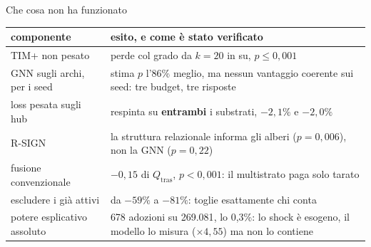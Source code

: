 \documentclass[aspectratio=169,10pt]{beamer}
\newcommand{\Qtras}{Q_{\mathrm{tras}}}
\begin{document}
\begin{frame}{Che cosa non ha funzionato}
  \centering
  \setlength{\tabcolsep}{8pt}
  \renewcommand{\arraystretch}{1.7}
  \begin{tabular}{|>{\raggedright\arraybackslash}m{}|>{\raggedright\arraybackslash}m{}|}
    \hline
    \rowcolor{tenue}\textbf{componente} & \textbf{esito, e come \`e stato verificato} \\
    \hline
    TIM+ non pesato & \textcolor{bordeaux}{perde col grado} da $k=20$ in su, $p \le 0{,}001$ \\
    \hline
    GNN sugli archi, per i seed & stima $p$ l'86\% meglio, ma nessun vantaggio coerente sui seed: tre budget, tre risposte \\
    \hline
    loss pesata sugli hub & respinta su \textbf{entrambi} i substrati, $-2{,}1\%$ e $-2{,}0\%$ \\
    \hline
    R-SIGN & la struttura relazionale informa gli alberi ($p=0{,}006$), non la GNN ($p=0{,}22$) \\
    \hline
    fusione convenzionale & $-0{,}15$ di $\Qtras$, $p<0{,}001$: il multistrato paga solo tarato \\
    \hline
    escludere i gi\`a attivi & da $-59\%$ a $-81\%$: toglie esattamente chi conta \\
    \hline
    potere esplicativo assoluto & \textcolor{bordeaux}{678 adozioni su 269.081}, lo 0,3\%: lo shock \`e esogeno, il modello lo misura ($\times 4{,}55$) ma non lo contiene \\
    \hline
  \end{tabular}
\end{frame}
\end{document}
